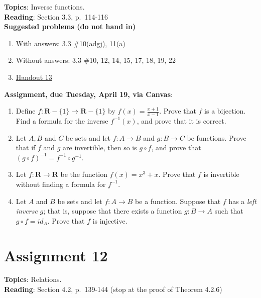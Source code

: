 \documentclass[12pt]{article}
\begin{document}
\textbf{Topics}: Inverse functions.
\\

\noindent \textbf{Reading}: Section 3.3, p.~114-116
\\

\noindent \textbf{Suggested problems (do not hand in)}

\begin{enumerate}
\item With answers: 3.3 \#10(adgj), 11(a)
\item Without answers: 3.3 \#10, 12, 14, 15, 17, 18, 19, 22
\item \href{https://www.math.emory.edu/~dzb/teaching/250Fall2021/handouts/250-H13-inverses.pdf}{Handout 13}
\end{enumerate}


\noindent \textbf{Assignment, due Tuesday, April 19, via Canvas}:
\begin{enumerate}
\item Define $f \colon \mathbf{R}-\{1\} \to \mathbf{R} - \{1\}$ by $f(x) = \frac{x+1}{x-1}$. Prove that $f$ is a bijection. Find a formula for the inverse $f^{-1}(x)$, and prove that it is correct.
\item Let $A, B$ and $C$ be sets and let $f \colon A \to B$ and $g \colon B \to C$ be functions. Prove that if $f$ and $g$ are invertible, then so is $g \circ f$, and prove that $(g \circ f)^{-1} = f^{-1} \circ g^{-1}$.
\item Let $f \colon \mathbf{R} \to \mathbf{R}$ be the function $f(x) = x^3 + x$. Prove that $f$ is invertible without finding a formula for $f^{-1}$.
\item Let $A$ and $B$ be sets and let $f \colon A \to B$ be a function. Suppose that $f$ has a \emph{left inverse} $g$; that is, suppose that there exists a function $g \colon B \to A$ such that $g \circ f = id_A$. Prove that $f$ is injective.
\end{enumerate}


\newpage
\section[12 (due April 25): Relations]{Assignment 12}

\textbf{Topics}: Relations.
\\

\noindent \textbf{Reading}: Section 4.2, p.~139-144 (stop at the proof of Theorem 4.2.6)
\\
\end{document}
